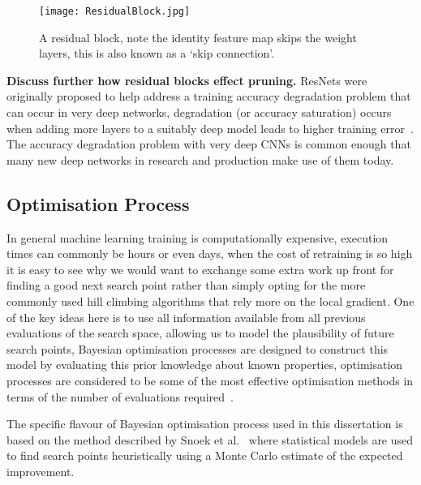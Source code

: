 \documentclass[../Dissertation.tex]{subfiles}
\begin{document}
\begin{figure}[H]
    \centering
    \texttt{[image: ResidualBlock.jpg]}
    \caption{A residual block, note the identity feature map skips the weight layers, this is also known as a `skip connection'.}
    \label{fig:ResidualBlock}
\end{figure}

\textbf{\color{red}Discuss further how residual blocks effect pruning.}
ResNets were originally proposed to help address a training accuracy degradation problem that can occur in very deep networks, degradation (or accuracy saturation) occurs when adding more layers to a suitably deep model leads to higher training error~\autocite{heDeepResidualLearning2016}.
The accuracy degradation problem with very deep CNNs is common enough that many new deep networks in research and production make use of them today.

\subsection{Optimisation Process}
In general machine learning training is computationally expensive, execution times can commonly be hours or even days, when the cost of retraining is so high it is easy to see why we would want to exchange some extra work up front for finding a good next search point rather than simply opting for the more commonly used hill climbing algorithms that rely more on the local gradient.
One of the key ideas here is to use all information available from all previous evaluations of the search space, allowing us to model the plausibility of future search points, Bayesian optimisation processes are designed to construct this model by evaluating this prior knowledge about known properties, optimisation processes are considered to be some of the most effective optimisation methods in terms of the number of evaluations required~\autocite{brochuTutorialBayesianOptimization2010}.

The specific flavour of Bayesian optimisation process used in this dissertation is based on the method described by Snoek et al.~\autocite{snoekPracticalBayesianOptimization2012} where statistical models are used to find search points heuristically using a Monte Carlo estimate of the expected improvement.
 
\end{document}
